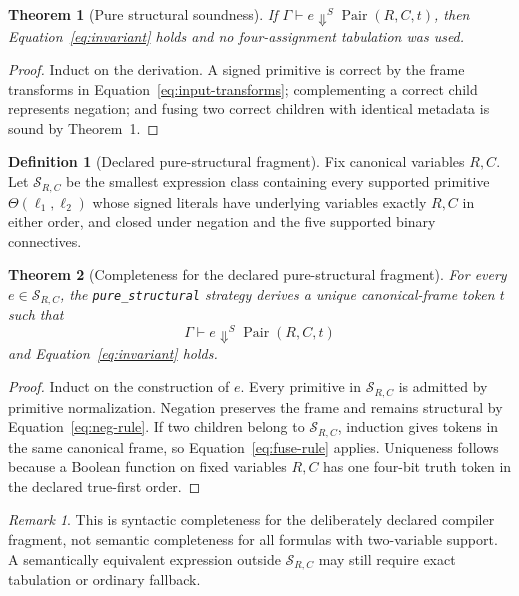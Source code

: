 \documentclass[10pt]{article}
\newcommand{\Pair}{\operatorname{Pair}}
\theoremstyle{plain}
\newtheorem{theorem}{Theorem}
\theoremstyle{definition}
\newtheorem{definition}{Definition}
\theoremstyle{remark}
\newtheorem{remark}{Remark}
\begin{document}
\begin{theorem}[Pure structural soundness]
If $\Gamma\vdash e\Downarrow^S\Pair(R,C,t)$, then Equation~\eqref{eq:invariant} holds and no four-assignment tabulation was used.
\end{theorem}

\begin{proof}
Induct on the derivation. A signed primitive is correct by the frame transforms in Equation~\eqref{eq:input-transforms}; complementing a correct child represents negation; and fusing two correct children with identical metadata is sound by Theorem~1.
\end{proof}

\begin{definition}[Declared pure-structural fragment]
Fix canonical variables $R,C$. Let $\mathcal S_{R,C}$ be the smallest expression class containing every supported primitive $\Theta(\ell_1,\ell_2)$ whose signed literals have underlying variables exactly $R,C$ in either order, and closed under negation and the five supported binary connectives.
\end{definition}

\begin{theorem}[Completeness for the declared pure-structural fragment]
For every $e\in\mathcal S_{R,C}$, the \texttt{pure\_structural} strategy derives a unique canonical-frame token $t$ such that
\[
 \Gamma\vdash e\Downarrow^S\Pair(R,C,t)
\]
and Equation~\eqref{eq:invariant} holds.
\end{theorem}

\begin{proof}
Induct on the construction of $e$. Every primitive in $\mathcal S_{R,C}$ is admitted by primitive normalization. Negation preserves the frame and remains structural by Equation~\eqref{eq:neg-rule}. If two children belong to $\mathcal S_{R,C}$, induction gives tokens in the same canonical frame, so Equation~\eqref{eq:fuse-rule} applies. Uniqueness follows because a Boolean function on fixed variables $R,C$ has one four-bit truth token in the declared true-first order.
\end{proof}

\begin{remark}
This is syntactic completeness for the deliberately declared compiler fragment, not semantic completeness for all formulas with two-variable support. A semantically equivalent expression outside $\mathcal S_{R,C}$ may still require exact tabulation or ordinary fallback.
\end{remark}
\end{document}
